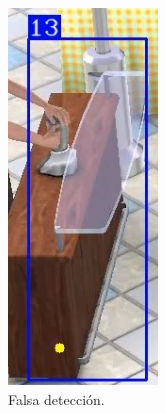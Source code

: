 \begin{figure}[!htpb]
     \centering
     \begin{subfigure}[b]{0.3\textwidth}
         \centering
         \includegraphics[width=.65\textwidth]{./Figures/fallasDetector1.jpg}
         \caption{Falsa detección.}
         \label{fig:fallasDetector1de3}
     \end{subfigure}
     \hfill
     \begin{subfigure}[b]{0.3\textwidth}
         \centering

\end{subfigure}
\end{figure}
